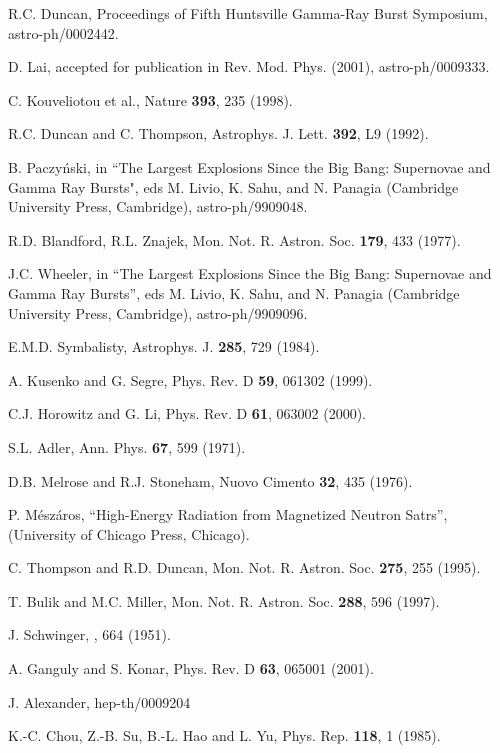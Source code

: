 \begin{references}

 R.C. Duncan, Proceedings of Fifth Huntsville Gamma-Ray
 Burst Symposium, astro-ph/0002442.

 D. Lai, accepted for publication in
 Rev. Mod. Phys. (2001), astro-ph/0009333. 

 C. Kouveliotou et al., Nature {\bf 393}, 235 (1998).

 R.C. Duncan and C. Thompson, Astrophys. J. Lett. {\bf 392},
 L9 (1992).

 B. Paczy\'{n}ski,  in ``The Largest Explosions Since the Big
     Bang: Supernovae and Gamma Ray Bursts", 
     eds M. Livio, K. Sahu, and N. Panagia (Cambridge
     University Press, Cambridge), astro-ph/9909048.

 R.D. Blandford, R.L. Znajek, Mon. Not. R. Astron. Soc. 
    {\bf 179}, 433 (1977).

 J.C. Wheeler, in ``The Largest Explosions Since the Big
     Bang: Supernovae and Gamma Ray Bursts'', 
     eds M. Livio, K. Sahu, and N. Panagia (Cambridge
     University Press, Cambridge), astro-ph/9909096.

 E.M.D. Symbalisty, Astrophys. J. {\bf 285}, 729 (1984).

 A. Kusenko and G. Segre, Phys. Rev. D {\bf 59}, 061302 (1999).

 C.J. Horowitz and G. Li, Phys. Rev. D {\bf 61}, 063002 (2000).

 S.L. Adler, Ann. Phys. {\bf 67}, 599 (1971).

     D.B. Melrose and R.J. Stoneham, Nuovo Cimento {\bf 32}, 435 (1976).

 P. M\'{e}sz\'{a}ros, ``High-Energy Radiation from
     Magnetized Neutron Satrs'', (University of Chicago Press, Chicago).

 C. Thompson and R.D. Duncan, Mon. Not. R. Astron. Soc. 
    {\bf 275}, 255 (1995).

 T. Bulik and M.C. Miller, Mon. Not. R. Astron. Soc. {\bf 288},
    596 (1997).

 J. Schwinger, , 664 (1951).

 A. Ganguly and S. Konar, Phys. Rev. D {\bf 63}, 065001 (2001).

 J. Alexander, hep-th/0009204 

 K.-C. Chou, Z.-B. Su, B.-L. Hao and L. Yu, Phys. Rep. 
    {\bf 118}, 1 (1985). 

\end{references}


